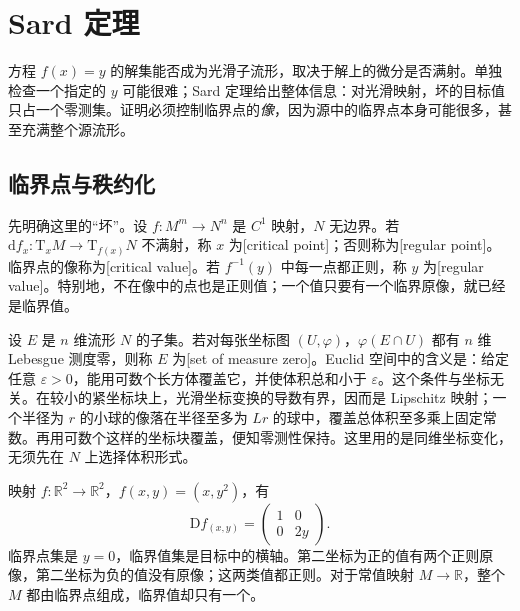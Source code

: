 
% 
% 

\section{Sard 定理}
\label{g2:sec:1402}

方程 \(f(x)=y\) 的解集能否成为光滑子流形，取决于解上的微分是否满射。单独检查一个指定的 \(y\) 可能很难；Sard 定理给出整体信息：对光滑映射，坏的目标值只占一个零测集。证明必须控制临界点的\emph{像}，因为源中的临界点本身可能很多，甚至充满整个源流形。

\subsection{临界点与秩约化}
\label{g2:subsec:1402:01}

先明确这里的“坏”。设 \(f:M^m\to N^n\) 是 \(C^1\) 映射，\(N\) 无边界。若 \(\mathrm{d}f_x:\mathrm{T}_xM\to\mathrm{T}_{f(x)}N\) 不满射，称 \(x\) 为[critical point]；否则称为[regular point]。临界点的像称为[critical value]。若 \(f^{-1}(y)\) 中每一点都正则，称 \(y\) 为[regular value]。特别地，不在像中的点也是正则值；一个值只要有一个临界原像，就已经是临界值。

\ProseParagraphBreak

设 \(E\) 是 \(n\) 维流形 \(N\) 的子集。若对每张坐标图 \((U,\varphi)\)，\(\varphi(E\cap U)\) 都有 \(n\) 维 Lebesgue 测度零，则称 \(E\) 为[set of measure zero]。Euclid 空间中的含义是：给定任意 \(\varepsilon>0\)，能用可数个长方体覆盖它，并使体积总和小于 \(\varepsilon\)。这个条件与坐标无关。在较小的紧坐标块上，光滑坐标变换的导数有界，因而是 Lipschitz 映射；一个半径为 \(r\) 的小球的像落在半径至多为 \(Lr\) 的球中，覆盖总体积至多乘上固定常数。再用可数个这样的坐标块覆盖，便知零测性保持。这里用的是同维坐标变化，无须先在 \(N\) 上选择体积形式。

\begin{example}\label{g2:exm:sard-critical-values}
	映射 \(f:\mathbb R^2\to\mathbb R^2\)，\(f(x,y)=(x,y^2)\)，有
	\[
		\mathrm{D}f_{(x,y)}=\begin{pmatrix}1&0\\0&2y\end{pmatrix}.
	\]
	临界点集是 \(y=0\)，临界值集是目标中的横轴。第二坐标为正的值有两个正则原像，第二坐标为负的值没有原像；这两类值都正则。对于常值映射 \(M\to\mathbb R\)，整个 \(M\) 都由临界点组成，临界值却只有一个。
\end{example}


